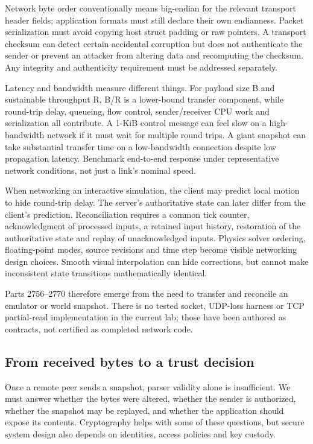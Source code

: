Network byte order conventionally means big-endian for the relevant transport header fields; application formats must still declare their own endianness. Packet serialization must avoid copying host struct padding or raw pointers. A transport checksum can detect certain accidental corruption but does not authenticate the sender or prevent an attacker from altering data and recomputing the checksum. Any integrity and authenticity requirement must be addressed separately.

Latency and bandwidth measure different things. For payload size B and sustainable throughput R, B/R is a lower-bound transfer component, while round-trip delay, queueing, flow control, sender/receiver CPU work and serialization all contribute. A 1-KiB control message can feel slow on a high-bandwidth network if it must wait for multiple round trips. A giant snapshot can take substantial transfer time on a low-bandwidth connection despite low propagation latency. Benchmark end-to-end response under representative network conditions, not just a link's nominal speed.

When networking an interactive simulation, the client may predict local motion to hide round-trip delay. The server's authoritative state can later differ from the client's prediction. Reconciliation requires a common tick counter, acknowledgment of processed inputs, a retained input history, restoration of the authoritative state and replay of unacknowledged inputs. Physics solver ordering, floating-point modes, source revisions and time step become visible networking design choices. Smooth visual interpolation can hide corrections, but cannot make inconsistent state transitions mathematically identical.

Parts 2756--2770 therefore emerge from the need to transfer and reconcile an emulator or world snapshot. There is no tested socket, UDP-loss harness or TCP partial-read implementation in the current lab; those have been authored as contracts, not certified as completed network code.

\subsection{From received bytes to a trust decision}\label{06-engine-ii-ch042-from-received-bytes-to-a-trust-decision}

\hypertarget{06-engine-ii-ch042-from-received-bytes-to-a-trust-decision}{}

Once a remote peer sends a snapshot, parser validity alone is insufficient. We must answer whether the bytes were altered, whether the sender is authorized, whether the snapshot may be replayed, and whether the application should expose its contents. Cryptography helps with some of these questions, but secure system design also depends on identities, access policies and key custody.

